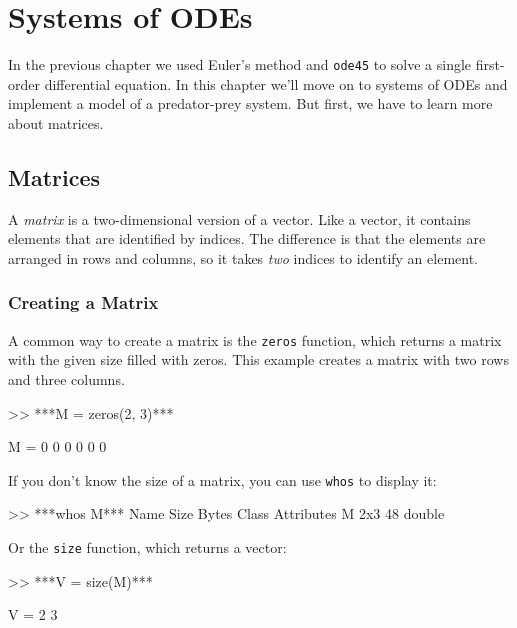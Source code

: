 \chapter{Systems of ODEs}
\label{systems}

In the previous chapter we used Euler's method and {\tt ode45} to solve a single first-order differential equation.  In this chapter we'll move on to systems of ODEs and implement a model of a predator-prey system.  But first, we have to learn more about matrices.


\section{Matrices}

A \emph{matrix} is a two-dimensional version of a vector.  Like a vector,
it contains elements that are identified by indices.  The difference
is that the elements are arranged in rows and columns, so it takes
{\em two} indices to identify an element.

\subsection{Creating a Matrix}


A common way to create a matrix is the {\tt zeros} function,
which returns a matrix with the given size filled with zeros.
This example creates a matrix with two rows and three columns.

\begin{code}
>> ***M = zeros(2, 3)***

M =  0     0     0
     0     0     0
\end{code}

If you don't know the size of a matrix, you can use {\tt whos} to display it:

\begin{code}
>> ***whos M***
  Name      Size            Bytes  Class     Attributes
  M         2x3                48  double   
\end{code}

Or the {\tt size} function, which returns a vector:


\begin{code}
>> ***V = size(M)***

V = 2    3
\end{code}

